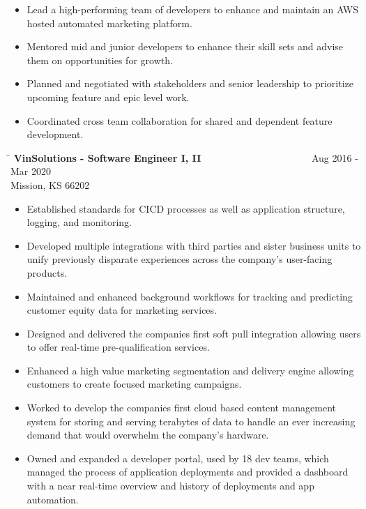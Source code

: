 \documentclass{res}
\begin{document}
\begin{resume}
\begin{changemargin}{-0.25in}{0in}
\begin{itemize}
		\item Lead a high-performing team of developers to enhance and maintain an AWS hosted automated marketing platform.
		\item Mentored mid and junior developers to enhance their skill sets and advise them on opportunities for growth.
		\item Planned and negotiated with stakeholders and senior leadership to prioritize upcoming feature and epic level work.
		\item Coordinated cross team collaboration for shared and dependent feature development.\vspace{-15pt}
	\end{itemize}
	\vspace{0.2in}
	\begin{tabbing}
   \hspace{5.5in}\= \kill 
    {\bf VinSolutions - Software Engineer I, II} \>~~~~~~~~~~~~~~~~~~~~~~Aug 2016 - Mar 2020\\
    Mission, KS 66202
	\end{tabbing}\vspace{-1pt}
	\begin{itemize}
		\item Established standards for CICD processes as well as application structure, logging, and monitoring.
		\item Developed multiple integrations with third parties and sister business units to unify previously disparate experiences across the company's user-facing products.
		\item Maintained and enhanced background workflows for tracking and predicting customer equity data for marketing services.
		\item Designed and delivered the companies first soft pull integration allowing users to offer real-time pre-qualification services.
		\item Enhanced a high value marketing segmentation and delivery engine allowing customers to create focused marketing campaigns.
		\item Worked to develop the companies first cloud based content management system for storing and serving terabytes of data to handle an ever increasing demand that would overwhelm the company's hardware.
		\item Owned and expanded a developer portal, used by 18 dev teams, which managed the process of application deployments and provided a dashboard with a near real-time overview and history of deployments and app automation.

\end{itemize}
\end{changemargin}
\end{resume}
\end{document}
